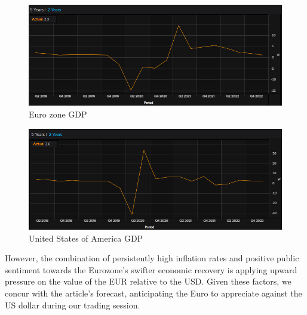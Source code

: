 \documentclass{article}
\begin{document}
\begin{figure}[h!]
    \centering
    \includegraphics[scale=0.5]{graphs/Eur-GDP.png}
    \caption{Euro zone GDP}
    \label{Euro zone GDP}
\end{figure}

\begin{figure}[h!]
    \centering
    \includegraphics[scale=0.5]{graphs/Us-GDP.png}
    \caption{United States of America GDP}
    \label{United States of America GDP}
\end{figure}

\noindent However, the combination of persistently high inflation rates and positive public sentiment towards the Eurozone's swifter economic recovery is applying upward pressure on the value of the EUR relative to the USD. Given these factors, we concur with the article's forecast, anticipating the Euro to appreciate against the US dollar during our trading session.
\end{document}
